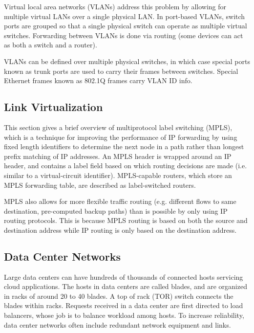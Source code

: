 \documentclass[12pt,titlepage]{article}
\begin{document}
        Virtual local area networks (VLANs) address this problem by allowing for multiple virtual LANs over a single physical LAN. In port-based VLANs,
        switch ports are grouped so that a single physical switch can operate as multiple virtual switches. Forwarding between VLANs is done via routing
        (some devices can act as both a switch and a router).

        VLANs can be defined over multiple physical switches, in which case special ports known as trunk ports are used to carry their frames between switches.
        Special Ethernet frames known as 802.1Q frames carry VLAN ID info.

    \subsection{Link Virtualization}
      This section gives a brief overview of multiprotocol label switching (MPLS), which is a technique for improving the performance of IP forwarding by using fixed
      length identifiers to determine the next node in a path rather than longest prefix matching of IP addresses. An MPLS header is wrapped around an IP header, and
      contains a label field based on which routing decisions are made (i.e. similar to a virtual-circuit identifier). MPLS-capable routers, which store an MPLS
      forwarding table, are described as label-switched routers.

      MPLS also allows for more flexible traffic routing (e.g. different flows to same destination, pre-computed backup paths) than is possible by only using IP
      routing protocols. This is because MPLS routing is based on both the source and destination address while IP routing is only based on the destination address.

    \subsection{Data Center Networks}
      Large data centers can have hundreds of thousands of connected hosts servicing cloud applications. The hosts in data centers are called blades, and are
      organized in racks of around 20 to 40 blades. A top of rack (TOR) switch connects the blades within racks. Requests received in a data center are first
      directed to load balancers, whose job is to balance workload among hosts. To increase reliability, data center networks often include redundant network
      equipment and links.
\end{document}
